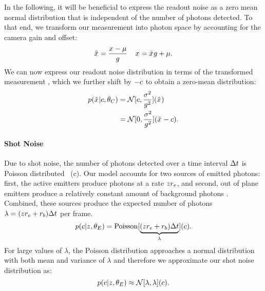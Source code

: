   In the following, it will be beneficial to express the readout noise as a
  zero mean normal distribution that is independent of the number of photons
  detected. To that end, we transform our measurement \x{} into photon space
  by accounting for the camera gain and offset:
  \begin{equation}
    \tilde{x}_{} = \frac{x_{} - \mu}{g}
    \;\;\;\;
    x_{} = \tilde{x}_{}g + \mu
    \text{.}
  \end{equation}
  We can now express our readout noise distribution in terms of the transformed
  measurement \xp{}, which we further shift by $-c$ to obtain a
  zero-mean distribution:
  \begin{align}
    p(\tilde{x}_{}|c,\theta_C)
      &= \mathcal{N}[c, \frac{\sigma^2}{g^2}](\tilde{x}_{})  \\
      &= \mathcal{N}[0, \frac{\sigma^2}{g^2}](\tilde{x}_{} - c)
      \label{eq:method:transformed_readout_noise}
    \text{.}
  \end{align}

\paragraph{Shot Noise}

Due to shot noise, the number of photons detected over a time interval
$\Delta t$ is Poisson distributed~\cite{mehta_poisson_2016}
(c).
  Our model accounts for two sources of emitted photons: first, the \z{} active
  emitters produce photons at a rate $z_{}r_e$, and second, out of plane
  emitters produce a relatively constant amount of background photons \rb.
  Combined, these sources produce the expected number of photons
  $\lambda=(z_{}r_e + r_b)\Delta t$ per frame.
  \begin{equation}
    p(c|z_{},\theta_E)
      = \operatorname{Poisson}[\underbrace{(z_{}r_e + r_b)\Delta t}_{\lambda}](c)
    \text{.}
    \label{eq:methods:p_c_given_z}
  \end{equation}
  For large values of $\lambda$, the Poisson distribution approaches a normal
  distribution with both mean and variance of $\lambda$ and therefore we
  approximate our shot noise distribution as:
  \begin{equation}
    p(c|z_{},\theta_E)
      \approx \mathcal{N}[\lambda, \lambda](c)
    \text{.}
    \label{eq:method:normal_approx_shot_noise}
  \end{equation}

